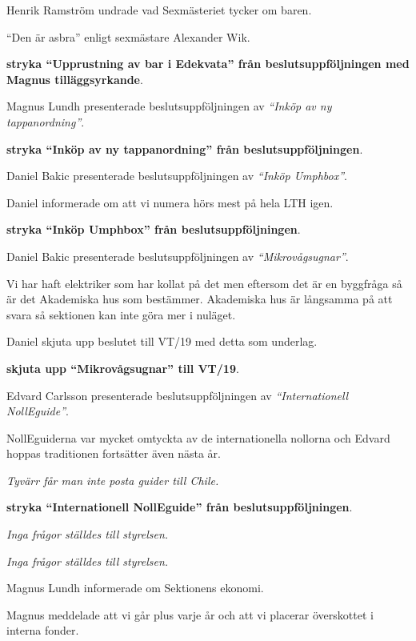 \documentclass[10pt]{article}
\begin{document}
\begin{paragrafer}
Henrik Ramström undrade vad Sexmästeriet tycker om baren.

``Den är asbra'' enligt sexmästare Alexander Wik.

\textbf{\Mba stryka ``Upprustning av bar i Edekvata'' från beslutsuppföljningen med Magnus tilläggsyrkande}.

Magnus Lundh presenterade beslutsuppföljningen av \emph{``Inköp av ny tappanordning''}.

\textbf{\Mba stryka ``Inköp av ny tappanordning'' från beslutsuppföljningen}.

Daniel Bakic presenterade beslutsuppföljningen av \emph{``Inköp Umphbox''}.

Daniel informerade om att vi numera hörs mest på hela LTH igen.

\textbf{\Mba stryka ``Inköp Umphbox'' från beslutsuppföljningen}.

Daniel Bakic presenterade beslutsuppföljningen av \emph{``Mikrovågsugnar''}.

Vi har haft elektriker som har kollat på det men eftersom det är en byggfråga så är det Akademiska hus som bestämmer. Akademiska hus är långsamma på att svara så sektionen kan inte göra mer i nuläget.

Daniel \ypa skjuta upp beslutet till VT/19 med detta som underlag.

\textbf{\Mba skjuta upp ``Mikrovågsugnar'' till VT/19}.

Edvard Carlsson presenterade beslutsuppföljningen av \emph{``Internationell  NollEguide''}.

NollEguiderna var mycket omtyckta av de internationella nollorna och Edvard hoppas traditionen fortsätter även nästa år. 

\emph{Tyvärr får man inte posta guider till Chile.}

\textbf{\Mba stryka ``Internationell  NollEguide'' från beslutsuppföljningen}.


\emph{Inga frågor ställdes till styrelsen.}


\emph{Inga frågor ställdes till styrelsen.}


Magnus Lundh informerade om Sektionens ekonomi. 

Magnus meddelade att vi går plus varje år och att vi placerar överskottet i interna fonder. 


\end{paragrafer}
\end{document}
